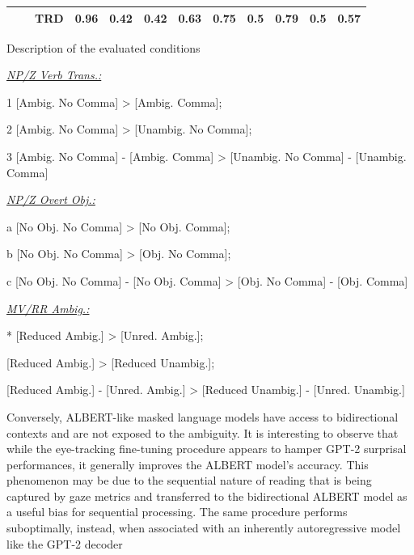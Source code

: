 \documentclass[a4paper, nobind]{templates/ociamthesis}
\begin{document}
\begin{landscape}
\begin{table}[!h]
\begin{threeparttable}
\begin{tabular}[t]{lllcc>{}c|cc>{}c|ccc}
\hspace{1em} &  & TRD & 0.96 & 0.42 & 0.42 & 0.63 & 0.75 & 0.5 & 0.79 & 0.5 & 0.57\\
\bottomrule
\end{tabular}
\begin{tablenotes}[para]
\small
\item Description of the evaluated conditions
\item \underline{\textit{NP/Z Verb Trans.: }} 
\item[1] [Ambig. No Comma] > [Ambig. Comma]; 
\item[2] [Ambig. No Comma] > [Unambig. No Comma]; 
\item[3] [Ambig. No Comma] - [Ambig. Comma] > [Unambig. No Comma] - [Unambig. Comma]
\item \underline{\textit{NP/Z Overt Obj.: }} 
\item[a] [No Obj. No Comma] > [No Obj. Comma]; 
\item[b] [No Obj. No Comma] > [Obj. No Comma]; 
\item[c] [No Obj. No Comma] - [No Obj. Comma] > [Obj. No Comma] - [Obj. Comma]
\item \underline{\textit{MV/RR Ambig.: }} 
\item[*] [Reduced Ambig.] > [Unred. Ambig.]; 
\item[\dag] [Reduced Ambig.] > [Reduced Unambig.]; 
\item[\ddag] [Reduced Ambig.] - [Unred. Ambig.] > [Reduced Unambig.] - [Unred. Unambig.]
\end{tablenotes}
\end{threeparttable}
\end{table}
\end{landscape}

Conversely, ALBERT-like masked language models have access to bidirectional contexts and are not exposed to the ambiguity. It is interesting to observe that while the eye-tracking fine-tuning procedure appears to hamper GPT-2 surprisal performances, it generally improves the ALBERT model's accuracy. This phenomenon may be due to the sequential nature of reading that is being captured by gaze metrics and transferred to the bidirectional ALBERT model as a useful bias for sequential processing. The same procedure performs suboptimally, instead, when associated with an inherently autoregressive model like the GPT-2 decoder
\end{document}
